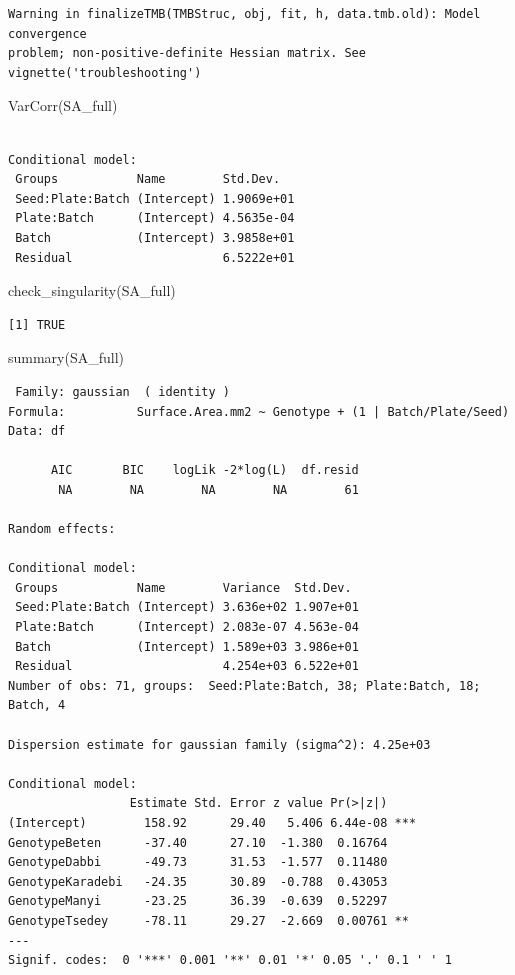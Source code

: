 \documentclass[
  letterpaper,
  DIV=11,
  numbers=noendperiod]{scrartcl}
\newenvironment{Shaded}{\begin{snugshade}}{\end{snugshade}}
\newcommand{\FunctionTok}[1]{\textcolor[rgb]{0.28,0.35,0.67}{#1}}
\newcommand{\NormalTok}[1]{\textcolor[rgb]{0.00,0.23,0.31}{#1}}
\begin{document}
\begin{verbatim}
Warning in finalizeTMB(TMBStruc, obj, fit, h, data.tmb.old): Model convergence
problem; non-positive-definite Hessian matrix. See vignette('troubleshooting')
\end{verbatim}

\begin{Shaded}
\begin{Highlighting}[]
\FunctionTok{VarCorr}\NormalTok{(SA\_full)}
\end{Highlighting}
\end{Shaded}

\begin{verbatim}

Conditional model:
 Groups           Name        Std.Dev.  
 Seed:Plate:Batch (Intercept) 1.9069e+01
 Plate:Batch      (Intercept) 4.5635e-04
 Batch            (Intercept) 3.9858e+01
 Residual                     6.5222e+01
\end{verbatim}

\begin{Shaded}
\begin{Highlighting}[]
\FunctionTok{check\_singularity}\NormalTok{(SA\_full)}
\end{Highlighting}
\end{Shaded}

\begin{verbatim}
[1] TRUE
\end{verbatim}

\begin{Shaded}
\begin{Highlighting}[]
\FunctionTok{summary}\NormalTok{(SA\_full)}
\end{Highlighting}
\end{Shaded}

\begin{verbatim}
 Family: gaussian  ( identity )
Formula:          Surface.Area.mm2 ~ Genotype + (1 | Batch/Plate/Seed)
Data: df

      AIC       BIC    logLik -2*log(L)  df.resid 
       NA        NA        NA        NA        61 

Random effects:

Conditional model:
 Groups           Name        Variance  Std.Dev. 
 Seed:Plate:Batch (Intercept) 3.636e+02 1.907e+01
 Plate:Batch      (Intercept) 2.083e-07 4.563e-04
 Batch            (Intercept) 1.589e+03 3.986e+01
 Residual                     4.254e+03 6.522e+01
Number of obs: 71, groups:  Seed:Plate:Batch, 38; Plate:Batch, 18; Batch, 4

Dispersion estimate for gaussian family (sigma^2): 4.25e+03 

Conditional model:
                 Estimate Std. Error z value Pr(>|z|)    
(Intercept)        158.92      29.40   5.406 6.44e-08 ***
GenotypeBeten      -37.40      27.10  -1.380  0.16764    
GenotypeDabbi      -49.73      31.53  -1.577  0.11480    
GenotypeKaradebi   -24.35      30.89  -0.788  0.43053    
GenotypeManyi      -23.25      36.39  -0.639  0.52297    
GenotypeTsedey     -78.11      29.27  -2.669  0.00761 ** 
---
Signif. codes:  0 '***' 0.001 '**' 0.01 '*' 0.05 '.' 0.1 ' ' 1
\end{verbatim}
\end{document}
